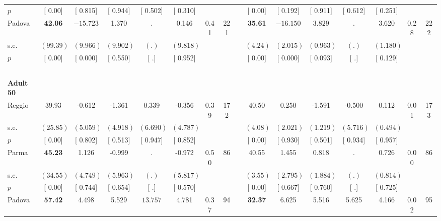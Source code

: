 \begin{longtable}{L{8em} c c c c c c c p{1em} c c c c c c c}
\quad \quad \quad \quad $ p$ & [     0.00] & [    0.815] & [    0.944] & [    0.502] & [    0.310] & & & & [     0.00] & [    0.192] & [    0.911] & [    0.612] & [    0.251] & &  \\[1em]
\quad \quad \quad Padova& \textbf{    42.06} & $ \mathbf{  -15.723}$ &     1.370 &         . &     0.146 &      0.41 &       221 & & \textbf{    35.61} & $ \mathbf{  -16.150}$ & $ \mathbf{    3.829}$ &         . &     3.620 &      0.28 &       222  \\*
\quad \quad \quad \quad s.e.& $ (    99.39)$ & $ (    9.966)$ & $ (    9.902)$ & $ (        .)$ & $ (    9.818)$ & & & & $ (     4.24)$ & $ (    2.015)$ & $ (    0.963)$ & $ (        .)$ & $ (    1.180)$ & &  \\*
\quad \quad \quad \quad $ p$ & [     0.00] & [    0.000] & [    0.550] & [        .] & [    0.952] & & & & [     0.00] & [    0.000] & [    0.093] & [        .] & [    0.129] & &  \\[1em]
~\\[1em]
\quad \quad \textbf{Adult 50} & & & & & & & & & & & & & & & \\* 
\quad \quad \quad Reggio& 39.93 &    -0.612 &    -1.361 &     0.339 &    -0.356 &      0.39 &       172 & & 40.50 &     0.250 &    -1.591 &    -0.500 &     0.112 &      0.01 &       173  \\*
\quad \quad \quad \quad s.e.& $ (    25.85)$ & $ (    5.059)$ & $ (    4.918)$ & $ (    6.690)$ & $ (    4.787)$ & & & & $ (     4.08)$ & $ (    2.021)$ & $ (    1.219)$ & $ (    5.716)$ & $ (    0.494)$ & &  \\*
\quad \quad \quad \quad $ p$ & [     0.00] & [    0.802] & [    0.513] & [    0.947] & [    0.852] & & & & [     0.00] & [    0.930] & [    0.501] & [    0.934] & [    0.957] & &  \\[1em]
\quad \quad \quad Parma& \textbf{    45.23} &     1.126 &    -0.999 &         . &    -0.972 &      0.50 &        86 & & 40.55 &     1.455 &     0.818 &         . &     0.726 &      0.00 &        86  \\*
\quad \quad \quad \quad s.e.& $ (    34.55)$ & $ (    4.749)$ & $ (    5.963)$ & $ (        .)$ & $ (    5.817)$ & & & & $ (     3.55)$ & $ (    2.795)$ & $ (    1.884)$ & $ (        .)$ & $ (    0.814)$ & &  \\*
\quad \quad \quad \quad $ p$ & [     0.00] & [    0.744] & [    0.654] & [        .] & [    0.570] & & & & [     0.00] & [    0.667] & [    0.760] & [        .] & [    0.725] & &  \\[1em]
\quad \quad \quad Padova& \textbf{    57.42} &     4.498 &     5.529 & $ \mathbf{   13.757}$ &     4.781 &      0.37 &        94 & & \textbf{    32.37} &     6.625 &     5.516 &     5.625 &     4.166 &      0.02 &        95  \\*

\end{longtable}
